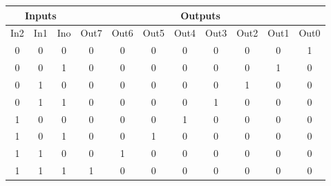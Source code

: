 \begin{center}
	\begin{tabular}{|ccc|cccccccc|}
		\hline \multicolumn{3}{|c|}{ Inputs } & \multicolumn{8}{c|}{ Outputs }                                                               \\
		\hline In2                            & In1                            & Ino & Out7 & Out6 & Out5 & Out4 & Out3 & Out2 & Out1 & Out0 \\
		0                                     & 0                              & 0   & 0    & 0    & 0    & 0    & 0    & 0    & 0    & 1    \\
		0                                     & 0                              & 1   & 0    & 0    & 0    & 0    & 0    & 0    & 1    & 0    \\
		0                                     & 1                              & 0   & 0    & 0    & 0    & 0    & 0    & 1    & 0    & 0    \\
		0                                     & 1                              & 1   & 0    & 0    & 0    & 0    & 1    & 0    & 0    & 0    \\
		1                                     & 0                              & 0   & 0    & 0    & 0    & 1    & 0    & 0    & 0    & 0    \\
		1                                     & 0                              & 1   & 0    & 0    & 1    & 0    & 0    & 0    & 0    & 0    \\
		1                                     & 1                              & 0   & 0    & 1    & 0    & 0    & 0    & 0    & 0    & 0    \\
		1                                     & 1                              & 1   & 1    & 0    & 0    & 0    & 0    & 0    & 0    & 0    \\
		\hline
	\end{tabular}
\end{center}
